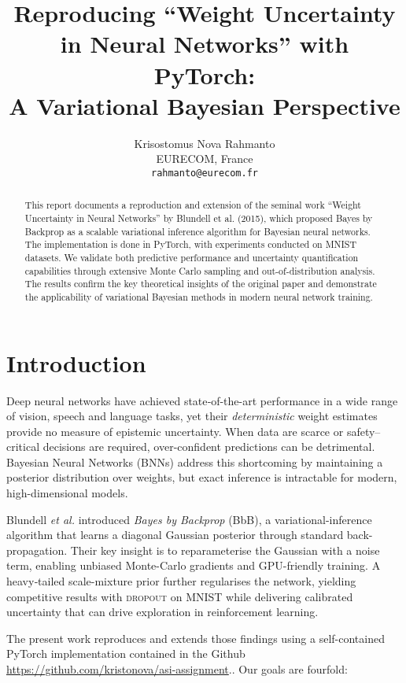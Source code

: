 \documentclass{article}
\title{Reproducing ``Weight Uncertainty in Neural Networks'' with PyTorch: \\ A Variational Bayesian Perspective}
\author{
  Krisostomus Nova Rahmanto \\
  EURECOM, France \\
  \texttt{rahmanto@eurecom.fr} \\
}
\begin{document}
\maketitle

\begin{abstract}
This report documents a reproduction and extension of the seminal work ``Weight Uncertainty in Neural Networks'' by Blundell et al. (2015), which proposed Bayes by Backprop as a scalable variational inference algorithm for Bayesian neural networks. The implementation is done in PyTorch, with experiments conducted on MNIST datasets. We validate both predictive performance and uncertainty quantification capabilities through extensive Monte Carlo sampling and out-of-distribution analysis. The results confirm the key theoretical insights of the original paper and demonstrate the applicability of variational Bayesian methods in modern neural network training.
\end{abstract}

\section{Introduction}
Deep neural networks have achieved state‐of-the-art performance in a wide range of vision, speech and language tasks, yet their \emph{deterministic} weight estimates provide no measure of epistemic uncertainty.  When data are scarce or safety–critical decisions are required, over-confident predictions can be detrimental.  Bayesian Neural Networks (BNNs) address this shortcoming by maintaining a posterior distribution over weights, but exact inference is intractable for modern, high-dimensional models.

Blundell \textit{et al.} \cite{blundell2015weight} introduced \emph{Bayes by Backprop} (BbB), a variational-inference algorithm that learns a diagonal Gaussian posterior through standard back-propagation.  Their key insight is to reparameterise the Gaussian with a noise term, enabling unbiased Monte-Carlo gradients and GPU-friendly training.  A heavy‐tailed scale-mixture prior further regularises the network, yielding competitive results with \textsc{dropout} on MNIST while delivering calibrated uncertainty that can drive exploration in reinforcement learning.

The present work reproduces and extends those findings using a self-contained PyTorch implementation contained in the Github \href{https://github.com/kristonova/asi-assignment}{https://github.com/kristonova/asi-assignment}..  Our goals are fourfold:
\end{document}
